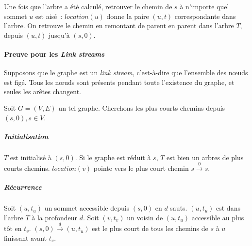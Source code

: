 \documentclass[12pt,a4paper]{article}
\begin{document}
Une fois que l'arbre a été calculé, retrouver le chemin de \(s\) à
n'importe quel sommet \(u\) est aisé~: \(location(u)\) donne la paire
\((u, t)\) correspondante dans l'arbre. On retrouve le chemin en
remontant de parent en parent dans l'arbre \(T\), depuis \((u, t)\)
jusqu'à \((s, 0)\).

\paragraph{Preuve pour les \textit{Link streams}} Supposons que le
graphe est un \textit{link stream}, c'est-à-dire que l'ensemble des
nœuds est figé. Tous les nœuds sont présents pendant toute l'existence
du graphe, et seules les arêtes changent.

Soit \(G = (V, E)\) un tel graphe. Cherchons les plus courts chemins
depuis \((s, 0), s \in V\).

\subparagraph{Initialisation} \(T\) est initialisé à \((s, 0)\). Si le
graphe est réduit à \(s\), \(T\) est bien un arbres de plus courts
chemins. \(location(v)\) pointe vers le plus court chemin
\(s \xrightarrow{0} s\).

\subparagraph{Récurrence} Soit \((u, t_u)\) un sommet accessible
depuis \((s, 0)\) en \(d\) sauts. \((u, t_u)\) est dans l'arbre \(T\)
à la profondeur \(d\). Soit \((v, t_v)\) un voisin de \((u, t_u)\)
accessible au plus tôt en \(t_v\). \((s, 0) \xrightarrow{d} (u, t_u)\)
est le plus court de tous les chemins de \(s\) à \(u\) finissant avant
\(t_v\). \\
\end{document}
